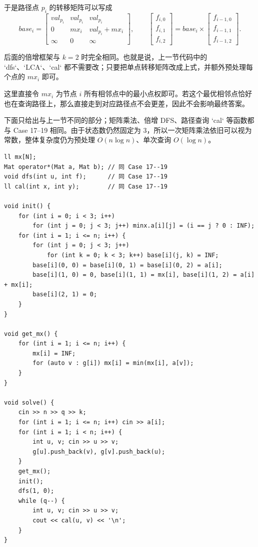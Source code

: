 \documentclass{book}
\begin{document}
    于是路径点 $p_i$ 的转移矩阵可以写成
    \[
    base_i=
    \begin{bmatrix}
    val_{p_i} & val_{p_i} & val_{p_i} \\
    0 & mx_i & val_{p_i}+mx_i \\
    \infty & 0 & \infty
    \end{bmatrix},
    \qquad
    \begin{bmatrix}
    f_{i,0} \\
    f_{i,1} \\
    f_{i,2}
    \end{bmatrix}
    =
    base_i
    \times
    \begin{bmatrix}
    f_{i-1,0} \\
    f_{i-1,1} \\
    f_{i-1,2}
    \end{bmatrix}.
    \]

    后面的倍增框架与 $k=2$ 时完全相同。也就是说，上一节代码中的 `dfs`、`LCA`、`cal` 都不需要改；只要把单点转移矩阵改成上式，并额外预处理每个点的 $mx_i$ 即可。

    这里直接令 $mx_i$ 为节点 $i$ 所有相邻点中的最小点权即可。若这个最优相邻点恰好也在查询路径上，那么直接走到对应路径点不会更差，因此不会影响最终答案。

    下面只给出与上一节不同的部分；矩阵乘法、倍增 DFS、路径查询 `cal` 等函数都与 Case 17--19 相同。由于状态数仍然固定为 $3$，所以一次矩阵乘法依旧可以视为常数，整体复杂度仍为预处理 $O(n\log n)$、单次查询 $O(\log n)$。

\newpage
\begin{lstlisting}[style = code]
ll mx[N];
Mat operator*(Mat a, Mat b); // 同 Case 17--19
void dfs(int u, int f);      // 同 Case 17--19
ll cal(int x, int y);        // 同 Case 17--19

void init() {
    for (int i = 0; i < 3; i++)
        for (int j = 0; j < 3; j++) minx.a[i][j] = (i == j ? 0 : INF);
    for (int i = 1; i <= n; i++) {
        for (int j = 0; j < 3; j++)
            for (int k = 0; k < 3; k++) base[i](j, k) = INF;
        base[i](0, 0) = base[i](0, 1) = base[i](0, 2) = a[i];
        base[i](1, 0) = 0, base[i](1, 1) = mx[i], base[i](1, 2) = a[i] + mx[i];
        base[i](2, 1) = 0;
    }
}

void get_mx() {
    for (int i = 1; i <= n; i++) {
        mx[i] = INF;
        for (auto v : g[i]) mx[i] = min(mx[i], a[v]);
    }
}

void solve() {
    cin >> n >> q >> k;
    for (int i = 1; i <= n; i++) cin >> a[i];
    for (int i = 1; i < n; i++) {
        int u, v; cin >> u >> v;
        g[u].push_back(v), g[v].push_back(u);
    }
    get_mx();
    init();
    dfs(1, 0);
    while (q--) {
        int u, v; cin >> u >> v;
        cout << cal(u, v) << '\n';
    }
}

\end{lstlisting}
\end{document}

